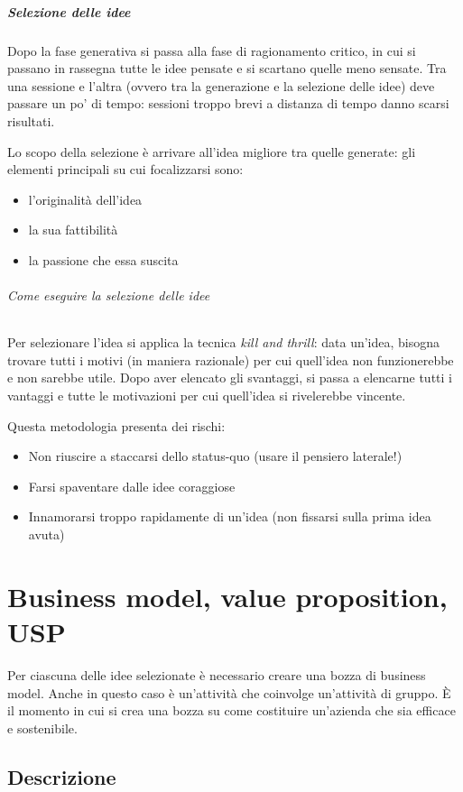 \paragraph*{Selezione delle idee} Dopo la fase generativa si passa alla fase di
ragionamento critico, in cui si passano in rassegna tutte le idee pensate e si
scartano quelle meno sensate. Tra una sessione e l'altra (ovvero tra la
generazione e la selezione delle idee) deve passare un po' di tempo: sessioni
troppo brevi a distanza di tempo danno scarsi risultati.

Lo scopo della selezione è arrivare all'idea migliore tra quelle generate: gli
elementi principali su cui focalizzarsi sono:
\begin{itemize}
 \item l'originalità dell'idea
 \item la sua fattibilità
 \item la passione che essa suscita
\end{itemize}

\subparagraph*{Come eseguire la selezione delle idee} Per selezionare l'idea si
applica la tecnica \textit{kill and thrill}: data un'idea, bisogna trovare
tutti i motivi (in maniera razionale) per cui quell'idea non funzionerebbe e
non sarebbe utile. Dopo aver elencato gli svantaggi, si passa a elencarne tutti
i vantaggi e tutte le motivazioni per cui quell'idea si rivelerebbe vincente.

Questa metodologia presenta dei rischi:
\begin{itemize}
 \item Non riuscire a staccarsi dello status-quo (usare il pensiero laterale!)
 \item Farsi spaventare dalle idee coraggiose
 \item Innamorarsi troppo rapidamente di un'idea (non fissarsi sulla prima idea
avuta)
\end{itemize}

\chapter{Business model, value proposition, USP}

Per ciascuna delle idee selezionate è necessario creare una bozza di business
model. Anche in questo caso è un'attività che coinvolge un'attività di gruppo. È
il momento in cui si crea una bozza su come costituire un'azienda che sia
efficace e sostenibile.

\section{Descrizione}

